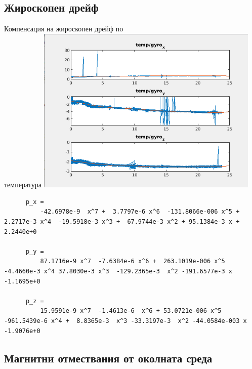 \documentclass{beamer}
\begin{document}
\subsection{Жироскопен дрейф}

\begin{frame}{Компенсация на жироскопен дрейф по\\температура}
	\pause
    \includegraphics[width=0.8\textwidth]{Images/gyro_drift_calibrate.png}

\end{frame}

\begin{frame}[fragile]
	\pause
	\begin{verbatim}
	  p_x = 
		  -42.6978e-9  x^7 +  3.7797e-6 x^6  -131.8066e-006 x^5 + 2.2717e-3 x^4  -19.5918e-3 x^3 +  67.9744e-3 x^2 + 95.1384e-3 x + 2.2440e+0
	
	  p_y =
		  87.1716e-9 x^7  -7.6384e-6 x^6 +  263.1019e-006 x^5  -4.4660e-3 x^4 37.8030e-3 x^3  -129.2365e-3  x^2 -191.6577e-3 x -1.1695e+0
	
	  p_z =
		  15.9591e-9 x^7  -1.4613e-6  x^6 + 53.0721e-006 x^5  -961.5439e-6 x^4 +  8.8365e-3  x^3 -33.3197e-3  x^2 -44.0584e-003 x -1.9076e+0
	\end{verbatim}
	\end{frame}


\subsection{Магнитни отмествания от околната среда}
\end{document}
